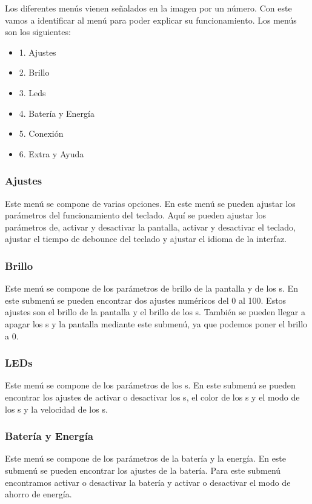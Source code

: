 Los diferentes menús vienen señalados en la imagen por un número. Con este vamos a identificar al menú para poder explicar su funcionamiento. Los menús son los siguientes:
\begin{itemize}
\item 1. Ajustes
\item 2. Brillo
\item 3. Leds
\item 4. Batería y Energía
\item 5. Conexión
\item 6. Extra y Ayuda
\end{itemize}

\subsubsection{Ajustes}
Este menú se compone de varias opciones. En este menú se pueden ajustar los parámetros del funcionamiento del teclado. Aquí se pueden ajustar los parámetros de, activar y desactivar la pantalla, activar y desactivar el teclado, ajustar el tiempo de debounce del teclado y ajustar el idioma de la interfaz.

\subsubsection{Brillo}
Este menú se compone de los parámetros de brillo de la pantalla y de los s. En este submenú se pueden encontrar dos ajustes numéricos del 0 al 100. Estos ajustes son el brillo de la pantalla y el brillo de los s. También se pueden llegar a apagar los s y la pantalla mediante este submenú, ya que podemos poner el brillo a 0.

\subsubsection{\gls{LED}s}
Este menú se compone de los parámetros de los s. En este submenú se pueden encontrar los ajustes de activar o desactivar los s, el color de los s y el modo de los s y la velocidad de los s.

\subsubsection{Batería y Energía}
Este menú se compone de los parámetros de la batería y la energía. En este submenú se pueden encontrar los ajustes de la batería. Para este submenú encontramos activar o desactivar la batería y activar o desactivar el modo de ahorro de energía.

